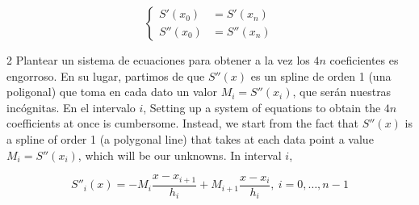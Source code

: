\begin{equation*}
\left\{
\begin{aligned}
S'(x_0)&=S'(x_n)\\
S''(x_0)&=S''(x_n)
\end{aligned}
\right.
\end{equation*}
\begin{paracol}{2}
Plantear un sistema de ecuaciones para obtener a la vez los $4n$ coeficientes es engorroso. En su lugar, partimos de que $S''(x)$ es un spline de orden 1 (una poligonal) que toma en cada dato un valor $M_i=S''(x_i)$, que serán nuestras incógnitas. En el intervalo $i$,
\switchcolumn
Setting up a system of equations to obtain the $4n$ coefficients at once is cumbersome. Instead, we start from the fact that $S''(x)$ is a spline of order 1 (a polygonal line) that takes at each data point a value $M_i=S''(x_i)$, which will be our unknowns. In interval $i$,
\end{paracol}
\begin{equation*}
S''_i(x)=-M_i\frac{x-x_{i+1}}{h_i}+M_{i+1}\frac{x-x_i}{h_i},\   i=0,\dots, n-1
\end{equation*}

